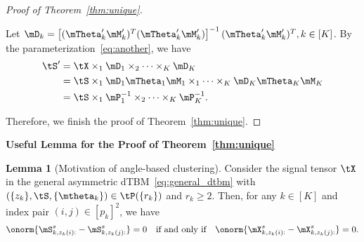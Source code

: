 \documentclass[lettersize,onecolumn,journal]{IEEEtran}
\theoremstyle{definition}
\newtheorem{lem}{Lemma}
\theoremstyle{definition}
\newcommand{\off}[1]{\left[#1\right]}
\begin{document}
\begin{proof}[Proof of Theorem~\ref{thm:unique}]
\begin{enumerate}[wide]
Let $\mD_k = \off{ (\mTheta'_k \mM'_k)^T (\mTheta'_k \mM'_k) }^{-1} (\mTheta'_k \mM'_k)^T, k \in [K]$. By the parameterization~\eqref{eq:another}, we have 
\begin{align}
    \tS' &= \tX \times_1 \mD_1 \times_2 \cdots \times_K \mD_K \\
    &= \tS \times_1 \mD_1 \mTheta_1 \mM_1 \times_1 \cdots \times_K \mD_K \mTheta_K \mM_K \\
    &= \tS \times_1 \mP^{-1}_1 \times_2 \cdots \times_K \mP^{-1}_K.
\end{align}


\end{enumerate}

Therefore, we finish the proof of Theorem~\ref{thm:unique}.
\end{proof}


{\bf Useful Lemma for the Proof of Theorem~\ref{thm:unique}} 

\begin{lem}[Motivation of angle-based clustering]\label{lem:angle} Consider the signal tensor $\tX$ in the general asymmetric dTBM~\eqref{eq:general_dtbm} with $(\{z_k\},\tS,\{\mtheta_k\})\in \tP(\{r_k\})$ and $r_k \geq 2$. Then, for any $k \in [K]$ and index pair $(i,j)\in[p_k]^2$, we have 
\begin{equation}
    \onorm{ \mS_{k,z_k(i):}^s -  \mS_{k,z_k(j):}^s } = 0 \quad \text{if and only if} \quad \onorm{  \mX_{k, z_k(i):}^s -  \mX_{k,z_k(j):}^s } = 0.
\end{equation}
\end{lem}
\end{document}
